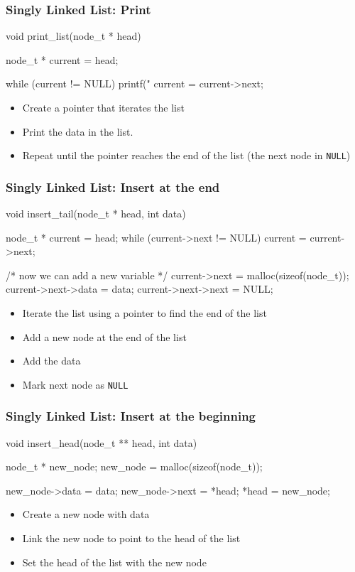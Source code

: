 \documentclass[newPxFont,sthlmFooter,nooffset]{beamer}
\begin{document}
\begin{frame}[t, fragile]
  \frametitle{Singly Linked List: Print}
\begin{ncodedef}
void print_list(node_t * head) {
    node_t * current = head;

    while (current != NULL) {
        printf("%
        current = current->next;
    }
}  
\end{ncodedef}
\bigskip
  \begin{itemize}
  \item Create a pointer that iterates the list
  \item Print the data in the list.
  \item Repeat until the pointer reaches the end of the list
    (the next node in \texttt{NULL})
  \end{itemize}

\end{frame}

\begin{frame}[t, fragile]
  \frametitle{Singly Linked List: Insert at the end}

  \begin{ncodedef}
void insert_tail(node_t * head, int data) {
    node_t * current = head;
    while (current->next != NULL) {
        current = current->next;
    }

    /* now we can add a new variable */
    current->next = malloc(sizeof(node_t));
    current->next->data = data;
    current->next->next = NULL;
}
  \end{ncodedef}  
\bigskip
  \begin{itemize}
  \item Iterate the list using a pointer to find the end of the list
  \item Add a new node at the end of the list
  \item Add the data
  \item Mark next node as \texttt{NULL}
  \end{itemize}

\end{frame}

\begin{frame}[t, fragile]
  \frametitle{Singly Linked List: Insert at the beginning}

\begin{ncodedef}
void insert_head(node_t ** head, int data) {
    node_t * new_node;
    new_node = malloc(sizeof(node_t));

    new_node->data = data;
    new_node->next = *head;
    *head = new_node;
}  
\end{ncodedef}
\bigskip
\begin{itemize}
\item Create a new node with data
\item Link the new node to point to the head of the list
\item Set the head of the list with the new node
\end{itemize}

\end{frame}
\end{document}
